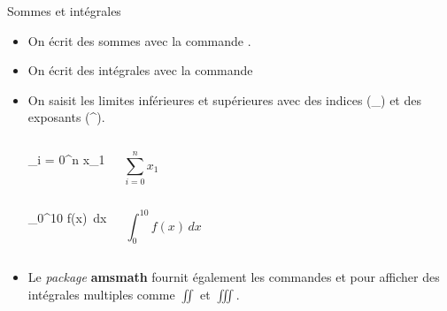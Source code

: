 \begin{frame}[fragile,c]{Sommes et intégrales}
	\begin{itemize}
		\item On écrit des sommes avec la commande .
		\item On écrit des intégrales avec la commande 
		\item On saisit les limites inférieures et supérieures avec des indices (\_) et 
			des exposants (\textasciicircum).
			\begin{columns}
\begin{codesource}
	\sum_{i = 0}^n x_1
\end{codesource}
					\begin{equation*}
						\sum_{i = 0}^n x_1
					\end{equation*}
			\end{columns}
			\begin{columns}
				\column{.4\textwidth}
\begin{codesource}
	\int_0^{10} f(x)\, dx
\end{codesource}
				\column{.4\textwidth}
					\begin{equation*}
						\int_0^{10} f(x)\, dx
					\end{equation*}
			\end{columns}
		\item Le \emph{package} \textbf{amsmath} fournit également les commandes 
			et  pour afficher des intégrales multiples comme $\iint$ et $\iiint$.
	\end{itemize}
\end{frame}

